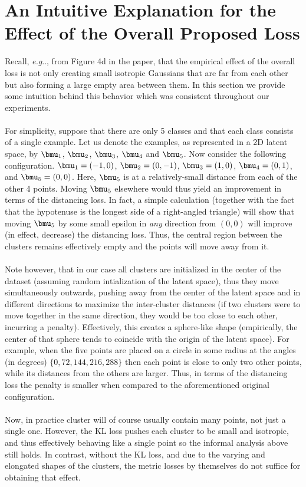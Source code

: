 \documentclass[accepted]{uai2022} %
\makeatletter
\DeclareRobustCommand\onedot{\futurelet\@let@token\@onedot}
\def\@onedot{\ifx\@let@token.\else.\null\fi\xspace}
\def\eg{\emph{e.g}\onedot} \def\Eg{\emph{E.g}\onedot}
\newcommand{\set}[1]{\ensuremath{{\{#1\}}}}
\makeatother
\begin{document}
\section{An Intuitive Explanation for the Effect of the Overall Proposed Loss}

Recall, \eg, from Figure 4d in the paper, that the empirical effect of the overall loss is not only creating small isotropic Gaussians that are far from each other
but also forming a large empty area between them. In this section we provide some intuition behind this behavior which was consistent throughout our experiments. 
\\\\
For simplicity, suppose that there are only 5 classes and that each class consists of a single example. Let us denote the examples, as represented in a 2D latent space, by $\bmu_1$, $\bmu_2$, $\bmu_3$, $\bmu_4$ and $\bmu_5$. Now consider the following configuration. $\bmu_1=(-1,0)$, $\bmu_2=(0,-1)$, $\bmu_3=(1,0)$, $\bmu_4=(0,1)$, and $\bmu_5=(0,0)$. Here, $\bmu_5$ is at a relatively-small distance from each of the other 4 points. Moving $\bmu_5$ elsewhere would thus yield an improvement in terms of the distancing loss. In fact, a simple calculation (together with the fact that the hypotenuse is the longest side of a right-angled triangle) will show that moving $\bmu_5$ by some small epsilon in \emph{any} direction from $(0,0)$ will improve (in effect, decrease) the distancing loss.
Thus, the central region between the clusters remains effectively empty and the points will move away from it.
\\\\
{Note however, that in our case all clusters are initialized in the center of the dataset (assuming random intialization of the latent space), thus they move simultaneously outwards, pushing away from the center of the latent space and} 
 in different directions to maximize the inter-cluster distances (if two clusters were to move together in the same direction, they would be too close to each other, incurring a penalty). Effectively, this creates a sphere-like shape (empirically, the center of that sphere tends to coincide with the origin of the latent space). 
For example, when the five points are placed on a circle in some radius at the angles (in degrees) $\set{0,72,144,216, 288}$ then each point is close to only two other points, while its distances from the others are larger. 
{Thus, in terms of the distancing loss the penalty is smaller when compared to the
aforementioned original configuration.}
\\\\
Now, in practice cluster will of course usually contain many points, not just a single one. However, the KL loss pushes each cluster to be small and isotropic, and thus effectively behaving like a single point so the informal analysis above still holds. In contrast, without the KL loss, and due to the varying and elongated shapes of the clusters, the metric losses by themselves do not suffice for obtaining that effect.
\end{document}
